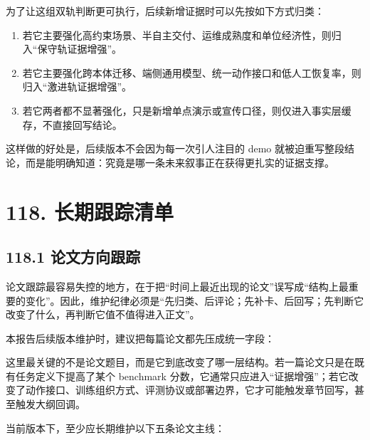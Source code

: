 为了让这组双轨判断更可执行，后续新增证据时可以先按如下方式归类：

\begin{enumerate}
\item 若它主要强化高约束场景、半自主交付、运维成熟度和单位经济性，则归入“保守轨证据增强”。
\item 若它主要强化跨本体迁移、端侧通用模型、统一动作接口和低人工恢复率，则归入“激进轨证据增强”。
\item 若它两者都不显著强化，只是新增单点演示或宣传口径，则仅进入事实层缓存，不直接回写结论。
\end{enumerate}

这样做的好处是，后续版本不会因为每一次引人注目的 demo 就被迫重写整段结论，而是能明确知道：究竟是哪一条未来叙事正在获得更扎实的证据支撑。

\section*{118. 长期跟踪清单}

\subsection*{118.1 论文方向跟踪}


论文跟踪最容易失控的地方，在于把“时间上最近出现的论文”误写成“结构上最重要的变化”。因此，维护纪律必须是“先归类、后评论；先补卡、后回写；先判断它改变了什么，再判断它值不值得进入正文”。

本报告后续版本维护时，建议把每篇论文都先压成统一字段：

\texttt{}

这里最关键的不是论文题目，而是它到底改变了哪一层结构。若一篇论文只是在既有任务定义下提高了某个 benchmark 分数，它通常只应进入“证据增强”；若它改变了动作接口、训练组织方式、评测协议或部署边界，它才可能触发章节回写，甚至触发大纲回调。

当前版本下，至少应长期维护以下五条论文主线：


